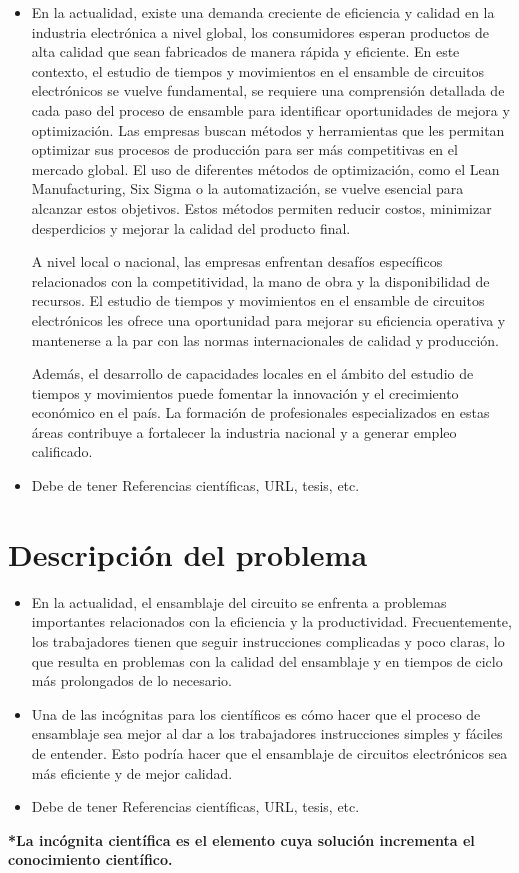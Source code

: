     \begin{itemize}
        \item En la actualidad, existe una demanda creciente de eficiencia y calidad en la industria electrónica a nivel global, los consumidores esperan productos de alta calidad que sean fabricados de manera rápida y eficiente. En este contexto, el estudio de tiempos y movimientos en el ensamble de circuitos electrónicos se vuelve fundamental, se requiere una comprensión detallada de cada paso del proceso de ensamble para identificar oportunidades de mejora y optimización.
    \cite{optimización}
    Las empresas buscan métodos y herramientas que les permitan optimizar sus procesos de producción para ser más competitivas en el mercado global. El uso de diferentes métodos de optimización, como el Lean Manufacturing, Six Sigma o la automatización, se vuelve esencial para alcanzar estos objetivos. Estos métodos permiten reducir costos, minimizar desperdicios y mejorar la calidad del producto final.
    
    A nivel local o nacional, las empresas enfrentan desafíos específicos relacionados con la competitividad, la mano de obra y la disponibilidad de recursos. El estudio de tiempos y movimientos en el ensamble de circuitos electrónicos les ofrece una oportunidad para mejorar su eficiencia operativa y mantenerse a la par con las normas internacionales de calidad y producción.
    
    Además, el desarrollo de capacidades locales en el ámbito del estudio de tiempos y movimientos puede fomentar la innovación y el crecimiento económico en el país. La formación de profesionales especializados en estas áreas contribuye a fortalecer la industria nacional y a generar empleo calificado.
        \item Debe de tener Referencias científicas, URL, tesis, etc.
    \end{itemize}
    \section{Descripción del problema}
    \begin{itemize}
        \item En la actualidad, el ensamblaje del circuito se enfrenta a problemas importantes relacionados con la eficiencia y la productividad. Frecuentemente, los trabajadores tienen que seguir instrucciones complicadas y poco claras, lo que resulta en problemas con la calidad del ensamblaje y en tiempos de ciclo más prolongados de lo necesario.
        \item Una de las incógnitas para los científicos es cómo hacer que el proceso de ensamblaje sea mejor al dar a los trabajadores instrucciones simples y fáciles de entender. Esto podría hacer que el ensamblaje de circuitos electrónicos sea más eficiente y de mejor calidad.
        \item Debe de tener Referencias científicas, URL, tesis, etc.
    \end{itemize}
    \cite{ensamblaje}
    \textbf{*La incógnita científica es el elemento cuya solución incrementa el conocimiento científico.}
